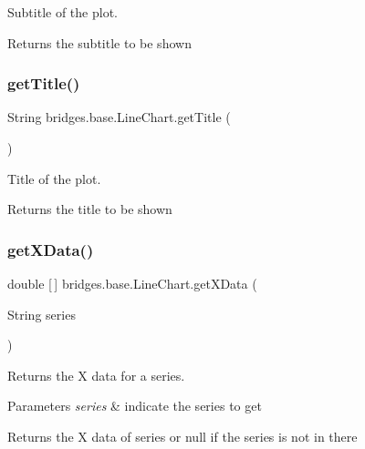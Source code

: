 Subtitle of the plot. 

\begin{DoxyReturn}{Returns}
the subtitle to be shown 
\end{DoxyReturn}
\mbox{\label{classbridges_1_1base_1_1_line_chart_aedc5f75b158298b755ba0c31bcf84138}} 
\subsubsection{\texorpdfstring{get\+Title()}{getTitle()}}
{\footnotesize\ttfamily String bridges.\+base.\+Line\+Chart.\+get\+Title (\begin{DoxyParamCaption}{ }\end{DoxyParamCaption})}



Title of the plot. 

\begin{DoxyReturn}{Returns}
the title to be shown 
\end{DoxyReturn}
\mbox{\label{classbridges_1_1base_1_1_line_chart_a34ef6ace0633d287a78d0e224f38f2ed}} 
\subsubsection{\texorpdfstring{get\+X\+Data()}{getXData()}}
{\footnotesize\ttfamily double \mbox{[}$\,$\mbox{]} bridges.\+base.\+Line\+Chart.\+get\+X\+Data (\begin{DoxyParamCaption}\item[{String}]{series }\end{DoxyParamCaption})}



Returns the X data for a series. 


\begin{DoxyParams}{Parameters}
{\em series} & indicate the series to get \\
\hline
\end{DoxyParams}
\begin{DoxyReturn}{Returns}
the X data of series or null if the series is not in there 
\end{DoxyReturn}
\mbox{\label{classbridges_1_1base_1_1_line_chart_a0885f5c62f950d96397b1704da6e2798}} 
